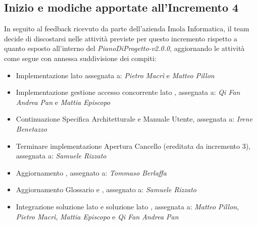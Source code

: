 \subsection{Inizio e modiche apportate all'Incremento 4}
In seguito al feedback ricevuto da parte dell'azienda Imola Informatica, il team decide di discostarsi nelle attività previste per questo incremento rispetto a quanto esposto all'interno del \textit{PianoDiProgetto-v2.0.0}, aggiornando le attività come segue con annessa suddivisione dei compiti:
\begin{itemize}
  \item Implementazione  lato  assegnata a: 
    \subitem\textit{Pietro Macrì} e \textit{Matteo Pillon}
  \item Implementazione gestione accesso concorrente lato , assegnata a: 
    \subitem \textit{Qi Fan Andrea Pan} e \textit{Mattia Episcopo}
  \item Continuazione Specifica Architetturale e Manuale Utente, assegnata a:
    \subitem\textit{Irene Benetazzo}
  \item Terminare implementazione Apertura Cancello (ereditata da incremento 3), assegnata a: 
    \subitem\textit{Samuele Rizzato}
  \item Aggiornamento , assegnato a: 
    \subitem\textit{Tommaso Berlaffa}
  \item Aggiornamento Glossario e , assegnato a: 
    \subitem\textit{Samuele Rizzato}
  \item Integrazione soluzione lato  e soluzione lato , assegnata a: 
    \subitem \textit{Matteo Pillon}, \textit{Pietro Macrì}, \textit{Mattia Episcopo} e \textit{Qi Fan Andrea Pan}
\end{itemize}
\newpage


